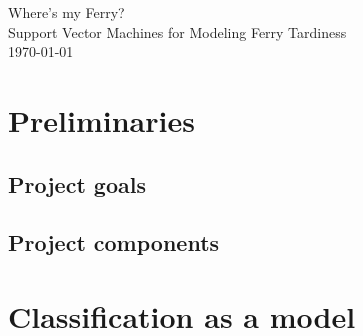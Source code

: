 \documentclass[11pt]{article} %
\begin{document}
\begin{titlepage}
    \vspace*{\fill}
    \begin{center}
      \Huge{Where's my Ferry?}\\[0.5cm]
      \Large{Support Vector Machines for Modeling Ferry Tardiness}\\[0.4cm]
      \today
    \end{center}
    \vspace*{\fill}
  \end{titlepage}
\newpage
\vspace*{\fill}
\tableofcontents
\vspace*{\fill}
\newpage

\section{Preliminaries}
\label{sec:prelims}

\subsection{Project goals}
\label{sec:goals}


\subsection{Project components}
\label{sec:components}

% 

\section{Classification as a model}
\label{sec:classification}
\end{document}
